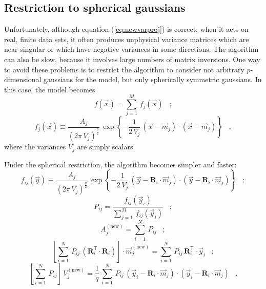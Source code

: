 \documentclass{article}
\begin{document}
\subsection{Restriction to spherical gaussians}

Unfortunately, although equation (\ref{eq:newvarproj}) is correct,
when it acts on real, finite data sets, it often produces unphysical
variance matrices which are near-singular or which have negative
variances in some directions.  The algorithm can also be slow, because
it involves large numbers of matrix inversions.  One way to avoid
these problems is to restrict the algorithm to consider not arbitrary
$p$-dimensional gaussians for the model, but only spherically
symmetric gaussians.  In this case, the model becomes
\begin{equation}
f(\vec{x})= \sum_{j=1}^M\,f_j(\vec{x}) \;\;\; ;
\end{equation}
\begin{equation}
f_j(\vec{x})\equiv
  \frac{A_j}{(2\pi\,V_j)^\frac{p}{2}}\,
  \exp\left\{-\frac{1}{2\,V_j}\,
  (\vec{x}-\vec{m}_j)\cdot(\vec{x}-\vec{m}_j)\right\}
  \;\;\; ,
\end{equation}
where the variances $V_j$ are simply scalars.

Under the spherical restriction, the algorithm becomes simpler and
faster:
\begin{equation}
f_{ij}(\vec{y})\equiv
  \frac{A_j}{(2\pi\,V_j)^\frac{q}{2}}\,
  \exp\left\{-\frac{1}{2\,V_j}\,
  (\vec{y}-\mathbf{R}_i\cdot\vec{m}_j)\cdot
  (\vec{y}-\mathbf{R}_i\cdot\vec{m}_j)\right\} \;\;\; ;
\end{equation}
\begin{equation}
P_{ij}= \frac{f_{ij}(\vec{y}_i)}{\sum_{j=1}^M\,f_{ij}(\vec{y}_i)} \;\;\; ;
\end{equation}
\begin{equation}
A_j^\mathrm{(new)}= \sum_{i=1}^N\,P_{ij} \;\;\; ;
\end{equation}
\begin{equation}
\label{eq:newmeanprojsphere}
\left[\sum_{i=1}^N\,P_{ij}\,
  (\mathbf{R}_i^\mathsf{T}\cdot\mathbf{R}_i)\right]\cdot
  \vec{m}_j^\mathrm{(new)}= 
  \sum_{i=1}^N\,P_{ij}\,\mathbf{R}_i^\mathsf{T}\cdot\vec{y}_i \;\;\; ;
\end{equation}
\begin{equation}
\label{eq:newvarprojsphere}
\left[\sum_{i=1}^N\,P_{ij}\right]\,V_j^\mathrm{(new)}=
  \frac{1}{q}\,\sum_{i=1}^N\,P_{ij}\,
  (\vec{y}_i-\mathbf{R}_i\cdot\vec{m}_j)\cdot
  (\vec{y}_i-\mathbf{R}_i\cdot\vec{m}_j) \;\;\; .
\end{equation}
\end{document}
